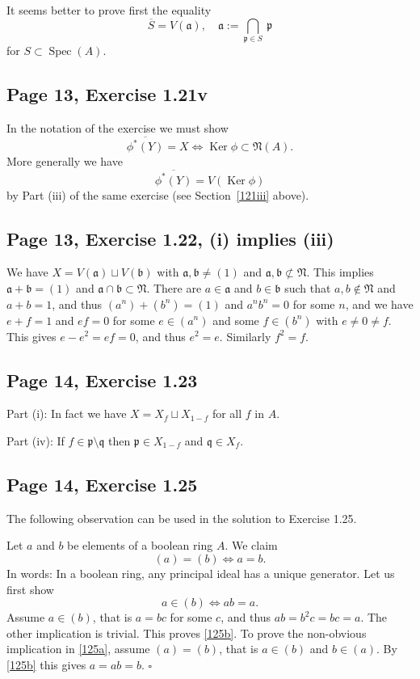 \documentclass[parskip=half,fontsize=12pt]{scrartcl}%
\newcommand{\oo}{\operatorname}\newcommand{\ooo}{\operatorname*}
\newcommand{\mf}{\mathfrak}
\newcommand{\aaa}{\mf a}
\newcommand{\bbb}{\mf b}
\newcommand{\ppp}{\mf p}
\newcommand{\Ker}{\operatorname{Ker}}\newcommand{\Coker}{\operatorname{Coker}}
\begin{document}
It seems better to prove first the equality 
$$
\overline S=V(\mf a),\quad \mf a:=\bigcap_{\ppp\in S}\ \ppp
$$ 
for $S\subset\oo{Spec}(A)$.

\subsection{Page 13, Exercise 1.21v}\label{121v}%

In the notation of the exercise we must show 
$$
\overline{\phi^*(Y)}=X\iff\Ker\phi\subset\mf N(A).
$$ 
More generally we have 
$$
\overline{\phi^*(Y)}=V(\Ker\phi)
$$ 
by Part (iii) of the same exercise (see Section~\ref{121iii} above).

\subsection{Page 13, Exercise 1.22, (i) implies (iii)}%

We have $X=V(\aaa)\sqcup V(\bbb)$ with $\aaa,\bbb\ne(1)$ and $\aaa,\bbb\not\subset\mf N$. This implies $\aaa+\bbb=(1)$ and $\aaa\cap\bbb\subset\mf N$. There are $a\in\aaa$ and $b\in\bbb$ such that $a,b\notin\mf N$ and $a+b=1$, and thus $(a^n)+(b^n)=(1)$ and $a^nb^n=0$ for some $n$, and we have $e+f=1$ and $ef=0$ for some $e\in(a^n)$ and some $f\in(b^n)$ with $e\ne0\ne f$. This gives $e-e^2=ef=0$, and thus $e^2=e$. Similarly $f^2=f$.

\subsection{Page 14, Exercise 1.23}%

Part (i): In fact we have $X=X_f\sqcup X_{1-f}$ for all $f$ in $A$.

Part (iv): If $f\in\ppp\setminus\mf q$ then $\ppp\in X_{1-f}$ and $\mf q\in X_f$.

\subsection{Page 14, Exercise 1.25}%

The following observation can be used in the solution to Exercise 1.25.

Let $a$ and $b$ be elements of a boolean ring $A$. We claim
\begin{equation}\label{125a}
(a)=(b)\iff a=b.
\end{equation} 
In words: In a boolean ring, any principal ideal has a unique generator. Let us first show 
\begin{equation}\label{125b}
a\in(b)\iff ab=a.
\end{equation}
Assume $a\in(b)$, that is $a=bc$ for some $c$, and thus $ab=b^2c=bc=a$. The other implication is trivial. This proves \eqref{125b}. To prove the non-obvious implication in \eqref{125a}, assume $(a)=(b)$, that is $a\in(b)$ and $b\in(a)$. By \eqref{125b} this gives $a=ab=b$. $\square$
\end{document}
